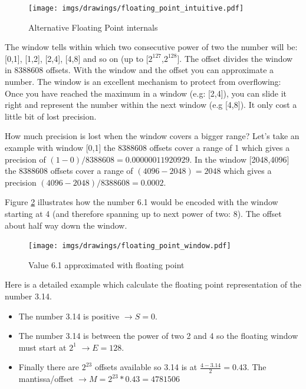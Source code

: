\documentclass[book.tex]{subfiles}
\begin{document}
\begin{figure}[H]
\centering
\texttt{[image: imgs/drawings/floating\_point\_intuitive.pdf]}
\caption{Alternative Floating Point internals}
\label{fig:fp_internals}
\end{figure}
  \bigskip  
The window tells within which two consecutive power of two the number will be: [0,1], [1,2], [2,4], [4,8] and so on (up to [$2^{127}$,$2^{128}$]. The offset divides the window in 8388608 offsets. With the window and the offset you can approximate a number. The window is an excellent mechanism to protect from overflowing: Once you have reached the maximum in a window (e.g: [2,4]), you can slide it right and represent the number within the next window (e.g [4,8]). It only cost a little bit of lost precision.\\


\par {} How much precision is lost when the window covers a bigger range? Let's take an example with window [0,1] the 8388608 offsets cover a range of 1 which gives a precision of $(1-0)/8388608=0.00000011920929$. In the window [2048,4096] the 8388608 offsets cover a range of $(4096-2048) = 2048$ which gives a precision $ (4096-2048)/8388608=0.0002$.\\
\par

Figure \ref{fig:fp_internals_window6_1} illustrates how the number 6.1 would be encoded with the window starting at 4 (and therefore spanning up to next power of two: 8). The offset about half way down the window.

\begin{figure}[H]
\centering
\texttt{[image: imgs/drawings/floating\_point\_window.pdf]}

\caption{Value 6.1 approximated with floating point}
\label{fig:fp_internals_window6_1}
\end{figure}
  \bigskip
  
Here is a detailed example which calculate the floating point representation of the number 3.14.
\begin{itemize}
 \item The number 3.14 is positive  $\rightarrow S=0$.
 \item The number 3.14 is between the power of two 2 and 4 so the floating window must start at $2^1$  $\rightarrow E=128$.
 \item Finally there are $2^{23}$ offsets available so 3.14 is at $\frac{4-3.14}{2} = 0.43 $. The mantissa/offset $\rightarrow M = 2^{23}*0.43 = 4781506$
\end{itemize}
\end{document}
